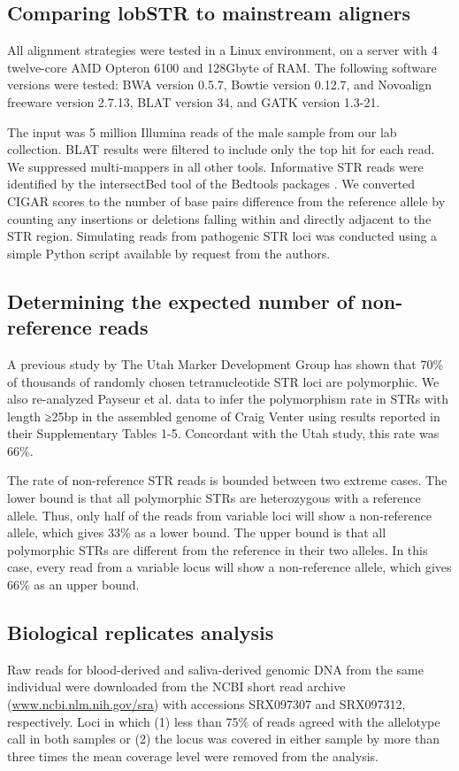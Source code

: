 \subsection{Comparing lobSTR to mainstream aligners}
All alignment strategies were tested in a Linux environment, on a server with 4 twelve-core AMD Opteron 6100 and 128Gbyte of RAM. The following software versions were tested: BWA version 0.5.7, Bowtie version 0.12.7, and Novoalign freeware version 2.7.13, BLAT version 34, and GATK version 1.3-21.

The input was 5 million Illumina reads of the male sample from our lab collection. BLAT results were filtered to include only the top hit for each read. We suppressed multi-mappers in all other tools. Informative STR reads were identified by the intersectBed tool of the Bedtools packages \cite{QuinlanHall2010}. We converted CIGAR scores to the number of base pairs difference from the reference allele by counting any insertions or deletions falling within and directly adjacent to the STR region. Simulating reads from pathogenic STR loci was conducted using a simple Python script available by request from the authors. 

\subsection{Determining the expected number of non-reference reads}

A previous study by The Utah Marker Development Group has shown that 70\% of thousands of randomly chosen tetranucleotide STR loci are polymorphic. We also re-analyzed Payseur et al. data to infer the polymorphism rate in STRs with length ≥25bp in the assembled genome of Craig Venter using results reported in their Supplementary Tables 1-5. Concordant with the Utah study, this rate was 66\%.

The rate of non-reference STR reads is bounded between two extreme cases. The lower bound is that all polymorphic STRs are heterozygous with a reference allele. Thus, only half of the reads from variable loci will show a non-reference allele, which gives 33\% as a lower bound. The upper bound is that all polymorphic STRs are different from the reference in their two alleles. In this case, every read from a variable locus will show a non-reference allele, which gives 66\% as an upper bound.  

\subsection{Biological replicates analysis}
Raw reads for blood-derived and saliva-derived genomic DNA from the same individual were downloaded from the NCBI short read archive (\url{www.ncbi.nlm.nih.gov/sra}) with accessions SRX097307 and SRX097312, respectively. Loci in which (1) less than 75\% of reads agreed with the allelotype call in both samples or (2) the locus was covered in either sample by more than three times the mean coverage level were removed from the analysis.

